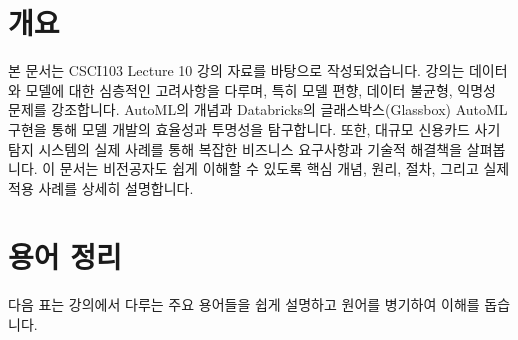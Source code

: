 \documentclass[11pt,a4paper]{article}
\begin{document}
\newpage
\section*{개요}

본 문서는 CSCI103 Lecture 10 강의 자료를 바탕으로 작성되었습니다.
강의는 데이터와 모델에 대한 심층적인 고려사항을 다루며, 특히 모델 편향, 데이터 불균형, 익명성 문제를 강조합니다.
AutoML의 개념과 Databricks의 글래스박스(Glassbox) AutoML 구현을 통해 모델 개발의 효율성과 투명성을 탐구합니다.
또한, 대규모 신용카드 사기 탐지 시스템의 실제 사례를 통해 복잡한 비즈니스 요구사항과 기술적 해결책을 살펴봅니다.
이 문서는 비전공자도 쉽게 이해할 수 있도록 핵심 개념, 원리, 절차, 그리고 실제 적용 사례를 상세히 설명합니다.

\newpage
\section*{용어 정리}

다음 표는 강의에서 다루는 주요 용어들을 쉽게 설명하고 원어를 병기하여 이해를 돕습니다.
\end{document}
